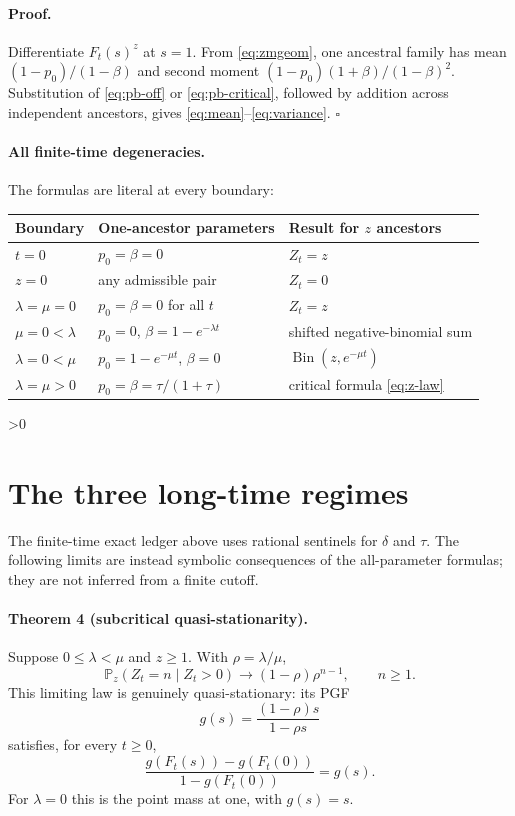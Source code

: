 \documentclass[9pt]{extarticle}
\newcommand{\Bin}{\operatorname{Bin}}
\begin{document}
\paragraph{Proof.}
Differentiate $F_t(s)^z$ at $s=1$.  From \eqref{eq:zmgeom}, one ancestral
family has mean $(1-p_0)/(1-\beta)$ and second moment
$(1-p_0)(1+\beta)/(1-\beta)^2$.  Substitution of
\eqref{eq:pb-off} or \eqref{eq:pb-critical}, followed by addition across
independent ancestors, gives \eqref{eq:mean}--\eqref{eq:variance}. \hfill$\square$

\paragraph{All finite-time degeneracies.}
The formulas are literal at every boundary:
\begin{center}
\begin{tabular}{@{}lll@{}}
\toprule
Boundary&One-ancestor parameters&Result for $z$ ancestors\\
\midrule
$t=0$&$p_0=\beta=0$&$Z_t=z$\\
$z=0$&any admissible pair&$Z_t=0$\\
$\lambda=\mu=0$&$p_0=\beta=0$ for all $t$&$Z_t=z$\\
$\mu=0<\lambda$&$p_0=0$, $\beta=1-e^{-\lambda t}$&shifted negative-binomial sum\\
$\lambda=0<\mu$&$p_0=1-e^{-\mu t}$, $\beta=0$&$\Bin(z,e^{-\mu t})$\\
$\lambda=\mu>0$&$p_0=\beta=\tau/(1+\tau)$&critical formula \eqref{eq:z-law}\\
\bottomrule
\end{tabular}
\end{center}

\ifnum\CRevisionRound>0
\section{The three long-time regimes}
The finite-time exact ledger above uses rational sentinels for $\delta$ and
$\tau$.  The following limits are instead symbolic consequences of the
all-parameter formulas; they are not inferred from a finite cutoff.

\paragraph{Theorem 4 (subcritical quasi-stationarity).}
Suppose $0\leq\lambda<\mu$ and $z\geq1$.  With
$\rho=\lambda/\mu$,
\[
 \mathbb P_z(Z_t=n\mid Z_t>0)\longrightarrow
 (1-\rho)\rho^{n-1},\qquad n\geq1.
\]
This limiting law is genuinely quasi-stationary: its PGF
\begin{equation}\label{eq:qsd-pgf}
 g(s)=\frac{(1-\rho)s}{1-\rho s}
\end{equation}
satisfies, for every $t\geq0$,
\begin{equation}\label{eq:qsd-invariance}
 \frac{g(F_t(s))-g(F_t(0))}{1-g(F_t(0))}=g(s).
\end{equation}
For $\lambda=0$ this is the point mass at one, with $g(s)=s$.
\end{document}
